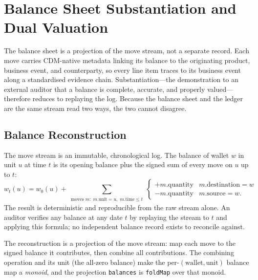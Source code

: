 \documentclass[11pt,a4paper]{article}
\begin{document}
\section{Balance Sheet Substantiation and Dual Valuation}
\label{sec:substantiation}

The balance sheet is a projection of the move stream, not a separate record. Each move carries CDM-native metadata linking its balance to the originating product, business event, and counterparty, so every line item traces to its business event along a standardised evidence chain. Substantiation---the demonstration to an external auditor that a balance is complete, accurate, and properly valued---therefore reduces to replaying the log. Because the balance sheet and the ledger are the same stream read two ways, the two cannot disagree.

\subsection{Balance Reconstruction}

The move stream is an immutable, chronological log. The balance of wallet $w$ in unit $u$ at time $t$ is its opening balance plus the signed sum of every move on $u$ up to $t$:
\[
w_t(u) = w_0(u) + \sum_{\substack{\text{moves } m:\; m.\text{unit}=u,\; m.\text{time}\leq t}}
\begin{cases}
+m.\text{quantity} & m.\text{destination}=w \\
-m.\text{quantity} & m.\text{source}=w.
\end{cases}
\]
The result is deterministic and reproducible from the raw stream alone. An auditor verifies any balance at any date $t$ by replaying the stream to $t$ and applying this formula; no independent balance record exists to reconcile against.

The reconstruction is a projection of the move stream: map each move to the signed balance it contributes, then combine all contributions. The combining operation and its unit (the all-zero balance) make the per-$(\text{wallet},\text{unit})$ balance map a \emph{monoid}, and the projection \lstinline!balances! is \lstinline!foldMap! over that monoid.
\end{document}
